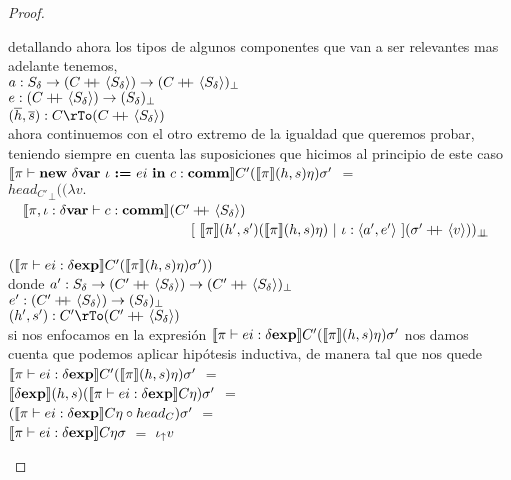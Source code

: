 \begin{proof}
\begin{itemize}
\begin{itemize}
detallando ahora los tipos de algunos componentes que van a ser relevantes
mas adelante tenemos,\\

$a : S_\delta \rightarrow 
(C +\kern-1.3ex+\kern0.8ex \langle S_\delta \rangle) \rightarrow (C +\kern-1.3ex+\kern0.8ex \langle S_\delta \rangle)_{\bot}$\\
$e : (C +\kern-1.3ex+\kern0.8ex \langle S_\delta \rangle) \rightarrow (S_\delta)_{\bot}$\\
$(\hover,\sover) : C \rTo (C \concat \lrangles{S_\delta})$\\

ahora continuemos con el otro extremo de la igualdad que queremos probar, teniendo 
siempre en cuenta las suposiciones que hicimos al principio de este caso\\

$\llbracket \pi \vdash \textbf{new} \ \delta \textbf{var} \ \iota \ \textbf{:=} \ ei \ \textbf{in} \ c : \textbf{comm} \rrbracket C'(\llbracket \pi \rrbracket(h,s)\eta)\sigma'$ $=$\\
${head_{C'}}_{\bot} ((\lambda v .$ \\
\indent \ \ 
	$\llbracket \pi,\iota:\delta \textbf{var} \vdash c : \textbf{comm} \rrbracket(C' +\kern-1.3ex+\kern0.8ex \langle S_\delta \rangle)$\\
\indent \ \ \ \ \ \ \ \ \ \ \ \ \ \ \ \ \ \ \ \ \ \ \ \ \ \
			$[ \ \semBrcks{\pi}(h',s')(\semBrcks{\pi}(h,s)\eta) \ | \ \iota:\lrangles{a',e'} \ ]
			(\sigma' \concat \lrangles{v}))_{\dbot}$\\
\indent \ \ \ \ \ \ \ \ \ \ \ \ \ \ \ \ \ \ \ \ \ \ \ \ \ \ \ \ \ \ \ \ \ \ \ \ \ \ \ \ \ \ \ \ \
 \ \ \ \ \ \ \ \ \ \ \ \ \ \ \ \ \ \ \
	$(\llbracket \pi \vdash ei : \delta \textbf{exp} \rrbracket C'(\llbracket \pi \rrbracket(h,s)\eta)\sigma'))$\\
	
donde $a' : S_\delta \rightarrow (C' +\kern-1.3ex+\kern0.8ex \langle S_\delta \rangle) 
			\rightarrow (C' +\kern-1.3ex+\kern0.8ex \langle S_\delta \rangle)_{\bot}$\\
$e' : (C' +\kern-1.3ex+\kern0.8ex \langle S_\delta \rangle) \rightarrow (S_\delta)_\bot$\\
$(h',s') : C' \rTo (C' \concat \lrangles{S_\delta})$\\

si nos enfocamos en la expresi\'on 
$\llbracket \pi \vdash ei : \delta \textbf{exp} \rrbracket C'(\llbracket \pi \rrbracket(h,s)\eta)\sigma'$ nos damos cuenta
que podemos aplicar hip\'otesis inductiva, de manera tal que nos quede\\

$\llbracket \pi \vdash ei : \delta \textbf{exp} \rrbracket C'(\llbracket \pi \rrbracket(h,s)\eta)\sigma'$ $=$\\
$\llbracket \delta \textbf{exp} \rrbracket(h,s)(\llbracket \pi \vdash ei : \delta \textbf{exp} \rrbracket C\eta)\sigma'$ $=$\\
$(\llbracket \pi \vdash ei : \delta \textbf{exp} \rrbracket C\eta \circ head_C) \sigma'$ $=$\\
$\llbracket \pi \vdash ei : \delta \textbf{exp} \rrbracket C\eta\sigma$ $=$ $\iota_{\uparrow} v$\\


\end{itemize}
\end{itemize}
\end{proof}
